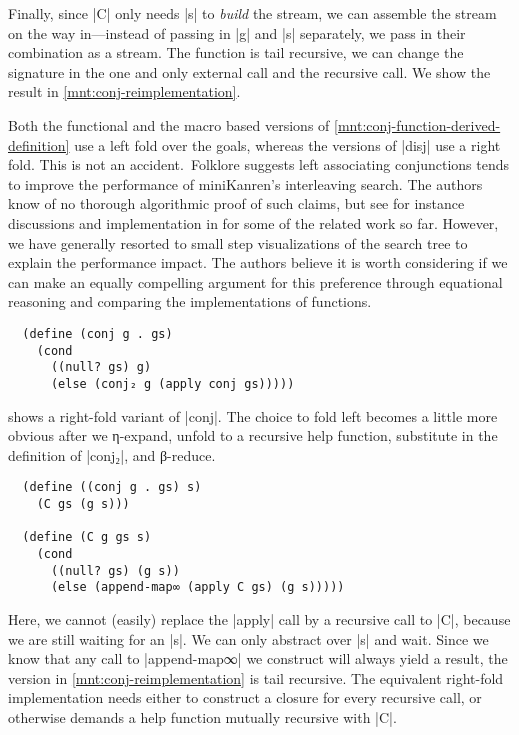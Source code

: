 \documentclass[sigplan,draft,natbib=false]{acmart}
\begin{document}
Finally, since \rackinline|C| only needs \rackinline|s| to
\emph{build} the stream, we can assemble the stream on the way
in---instead of passing in \rackinline|g| and \rackinline|s|
separately, we pass in their combination as a stream. The function is
tail recursive, we can change the signature in the one and only
external call and the recursive call. We show the result
in \cref{mnt:conj-reimplementation}.

Both the functional and the macro based versions of
\cref{mnt:conj-function-derived-definition} use a left fold over the
goals, whereas the versions of \rackinline|disj| use a right fold.
This is not an accident.\ Folklore suggests left associating
conjunctions tends to improve the performance of miniKanren's
interleaving search. The authors know of no thorough algorithmic proof
of such claims, but see for instance discussions and implementation in
\cite{rosenblatt2019first} for some of the related work so far.
However, we have generally resorted to small step visualizations of
the search tree to explain the performance impact. The authors believe
it is worth considering if we can make an equally compelling argument
for this preference through equational reasoning and comparing the
implementations of functions.

\begin{listing}[h]
\begin{verbatim}
  (define (conj g . gs)
    (cond
      ((null? gs) g)
      (else (conj₂ g (apply conj gs)))))
\end{verbatim}
  \caption{A right-fold variant of \rackinline|conj|}
  \label{mnt:conj-right-fold-definition}
\end{listing}

 shows a right-fold variant of
\rackinline|conj|. The choice to fold left becomes a little more
obvious after we η-expand, unfold to a recursive help function,
substitute in the definition of \rackinline|conj₂|, and β-reduce.

\begin{verbatim}
  (define ((conj g . gs) s)
    (C gs (g s)))

  (define (C g gs s)
    (cond
      ((null? gs) (g s))
      (else (append-map∞ (apply C gs) (g s)))))
\end{verbatim}

\noindent Here, we cannot (easily) replace the \rackinline|apply| call
by a recursive call to \rackinline|C|, because we are still waiting
for an \rackinline|s|. We can only abstract over \rackinline|s| and
wait. Since we know that any call to \rackinline|append-map∞| we
construct will always yield a result, the version in
\cref{mnt:conj-reimplementation} is tail recursive. The equivalent
right-fold implementation needs either to construct a closure for
every recursive call, or otherwise demands a help function mutually
recursive with \rackinline|C|.
\end{document}
